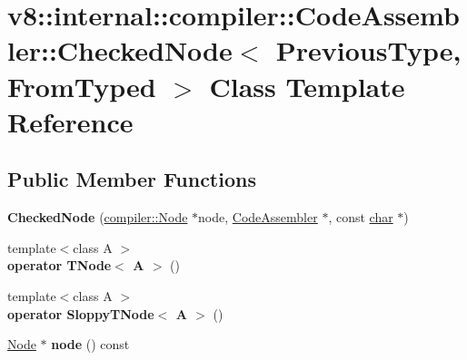 \hypertarget{classv8_1_1internal_1_1compiler_1_1CodeAssembler_1_1CheckedNode}{}\section{v8\+:\+:internal\+:\+:compiler\+:\+:Code\+Assembler\+:\+:Checked\+Node$<$ Previous\+Type, From\+Typed $>$ Class Template Reference}
\label{classv8_1_1internal_1_1compiler_1_1CodeAssembler_1_1CheckedNode}
\subsection*{Public Member Functions}
\begin{DoxyCompactItemize}
\item 
\mbox{\label{classv8_1_1internal_1_1compiler_1_1CodeAssembler_1_1CheckedNode_a222f75f0b12996d0a05f65edcd524e5b}} 
{\bfseries Checked\+Node} (\mbox{\hyperlink{classv8_1_1internal_1_1compiler_1_1Node}{compiler\+::\+Node}} $\ast$node, \mbox{\hyperlink{classv8_1_1internal_1_1compiler_1_1CodeAssembler}{Code\+Assembler}} $\ast$, const \mbox{\hyperlink{classchar}{char}} $\ast$)
\item 
\mbox{\label{classv8_1_1internal_1_1compiler_1_1CodeAssembler_1_1CheckedNode_a63dab55630b6ff82512c628b70a6e2a1}} 
{\footnotesize template$<$class A $>$ }\\{\bfseries operator T\+Node$<$ A $>$} ()
\item 
\mbox{\label{classv8_1_1internal_1_1compiler_1_1CodeAssembler_1_1CheckedNode_a90fb89b5286e0b1813940f8d6cc87968}} 
{\footnotesize template$<$class A $>$ }\\{\bfseries operator Sloppy\+T\+Node$<$ A $>$} ()
\item 
\mbox{\label{classv8_1_1internal_1_1compiler_1_1CodeAssembler_1_1CheckedNode_ac2a3e856fb9f667f440418d884e2766b}} 
\mbox{\hyperlink{classv8_1_1internal_1_1compiler_1_1Node}{Node}} $\ast$ {\bfseries node} () const
\end{DoxyCompactItemize}


